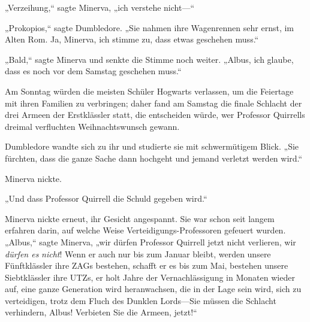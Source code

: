 „Verzeihung,“ sagte Minerva, „ich verstehe nicht—“

„Prokopios,“ sagte Dumbledore. „Sie nahmen ihre Wagenrennen sehr ernst, im Alten Rom. Ja, Minerva, ich stimme zu, dass etwas geschehen muss.“

„Bald,“ sagte Minerva und senkte die Stimme noch weiter. „Albus, ich glaube, dass es noch vor dem Samstag geschehen muss.“

Am Sonntag würden die meisten Schüler Hogwarts verlassen, um die Feiertage mit ihren Familien zu verbringen; daher fand am Samstag die finale Schlacht der drei Armeen der Erstklässler statt, die entscheiden würde, wer Professor Quirrells dreimal verfluchten Weihnachtswunsch gewann.

Dumbledore wandte sich zu ihr und studierte sie mit schwermütigem Blick. „Sie fürchten, dass die ganze Sache dann hochgeht und jemand verletzt werden wird.“

Minerva nickte.

„Und dass Professor Quirrell die Schuld gegeben wird.“

Minerva nickte erneut, ihr Gesicht angespannt. Sie war schon seit langem erfahren darin, auf welche Weise Verteidigungs-Professoren gefeuert wurden. „Albus,“ sagte Minerva, „wir dürfen Professor Quirrell jetzt nicht verlieren, wir \emph{dürfen es} \emph{nicht}! Wenn er auch nur bis zum Januar bleibt, werden unsere Fünftklässler ihre ZAGs bestehen, schafft er es bis zum Mai, bestehen unsere Siebtklässler ihre UTZs, er holt Jahre der Vernachlässigung in Monaten wieder auf, eine ganze Generation wird heranwachsen, die in der Lage sein wird, sich zu verteidigen, trotz dem Fluch des Dunklen Lords—Sie müssen die Schlacht verhindern, Albus! Verbieten Sie die Armeen, jetzt!“

